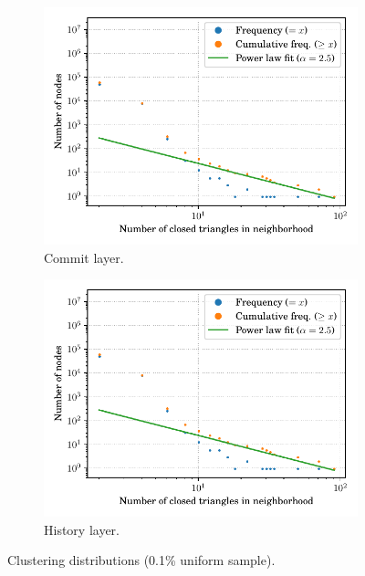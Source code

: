 \begin{figure}
    \begin{subfigure}{.49\textwidth}
        \centering
        \includegraphics[width=\linewidth]{img/topology/clusteringcoeff/rev}
        \caption{Commit layer.}%
        \label{fig:clustering_rev}
    \end{subfigure}\hfill
    \begin{subfigure}{.49\textwidth}
        \centering
        \includegraphics[width=\linewidth]{img/topology/clusteringcoeff/rel+rev}
        \caption{History layer.}%
        \label{fig:clustering_rel+rev}
    \end{subfigure}

    \caption{Clustering distributions (0.1\% uniform sample).}%
    \label{fig:clustering}
\end{figure}%

